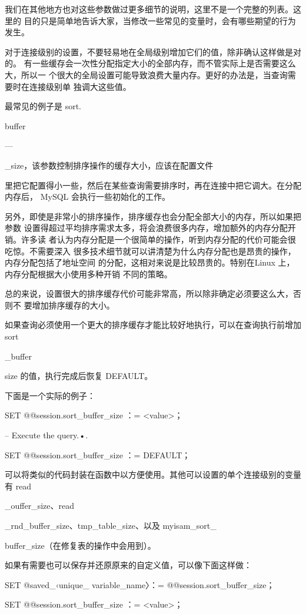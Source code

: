 我们在其他地方也对这些参数做过更多细节的说明，这里不是一个完整的列表。这里的
目的只是简单地告诉大家，当修改一些常见的变量时，会有哪些期望的行为发生。

对于连接级别的设置，不要轻易地在全局级别增加它们的值，除非确认这样做是对的。
有一些缓存会一次性分配指定大小的全部内存，而不管实际上是否需要这么大，所以一
个很大的全局设置可能导致浪费大量内存。更好的办法是，当查询需要时在连接级别单
独调大这些值。

最常见的例子是 sort.

buffer

—

\_size，该参数控制排序操作的缓存大小，应该在配置文件

里把它配置得小一些，然后在某些查询需要排序时，再在连接中把它调大。在分配内存后，
MySQL 会执行一些初始化的工作。

另外，即使是非常小的排序操作，排序缓存也会分配全部大小的内存，所以如果把参数
设置得超过平均排序需求太多，将会浪费很多内存，增加额外的内存分配开销。许多读
者认为内存分配是一个很简单的操作，听到内存分配的代价可能会很吃惊。不需要深入
很多技术细节就可以讲清楚为什么内存分配也是昂贵的操作，内存分配包括了地址空间
的分配，这相对来说是比较昂贵的。特别在Linux 上，内存分配根据大小使用多种开销
不同的策略。

总的来说，设置很大的排序缓存代价可能非常高，所以除非确定必须要这么大，否则不
要增加排序缓存的大小。

如果查询必须使用一个更大的排序缓存才能比较好地执行，可以在查询执行前增加
sort

\_buffer

size 的值，执行完成后恢复 DEFAULT。

下面是一个实际的例子：

SET @@session.sort\_buffer\_size ：= <value>；

-- Execute the query.•.

SET @@session.sort\_buffer\_size ：= DEFAULT；

可以将类似的代码封装在函数中以方便使用。其他可以设置的单个连接级别的变量
有 read

\_ouffer\_size、read

\_rnd\_buffer\_size、tmp\_table\_size、以及 myisam\_sort\_

buffer\_size（在修复表的操作中会用到）。

如果有需要也可以保存并还原原来的自定义值，可以像下面这样做：

SET @saved\_‹unique\_ variable\_name〉：= @@session.sort\_buffer\_size；

SET @@session.sort\_buffer\_size ：= <value>；

